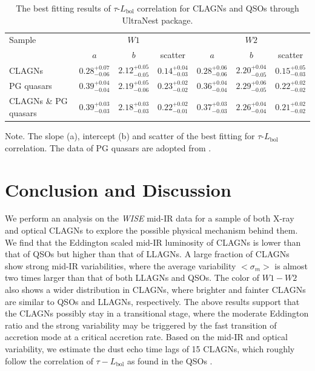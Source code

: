 \documentclass[linenumbers]{aastex631}
\begin{document}
\begin{table}[h!]
\renewcommand{\arraystretch}{1.5}
 \caption{The best fitting results of $\tau$-$L_{\mathrm{bol}}$ correlation for CLAGNs and QSOs through UltraNest package.
}
 \label{table_tau_L_fit}
 \begin{center}
 \begin{tabular}{lcccccc}
 \hline\hline
Sample    & \multicolumn{3}{c}{$W1$} &   \multicolumn{3}{c}{$W2$}      \\ %
           &    $a$    & $b$   &    scatter   &  $a$            &     $b$    & scatter        \\ \hline
CLAGNs      &    $0.28^{+0.07}_{-0.06}$ & $2.12^{+0.05}_{-0.05}$ & $0.14^{+0.04}_{-0.03}$  & $0.28^{+0.06}_{-0.06}$  &  $2.20^{+0.04}_{-0.05}$     &  $0.15^{+0.05}_{-0.03}$  \\ 
PG quasars    &    $0.39^{+0.04}_{-0.04}$ & $2.19^{+0.05}_{-0.06}$  &   $0.23^{+0.02}_{-0.02}$   & $0.36^{+0.04}_{-0.04}$  & $2.29^{+0.06}_{-0.05}$    & $0.22^{+0.02}_{-0.02}$  \\
CLAGNs \& PG quasars &   $0.39^{+0.03}_{-0.03}$ & $2.18^{+0.03}_{-0.03}$ & $0.22^{+0.02}_{-0.01}$ & $0.37^{+0.03}_{-0.03}$   & $2.26^{+0.04}_{-0.04}$        &$0.21^{+0.02}_{-0.02}$   \\ 

\hline\hline
\end{tabular}
\end{center}
Note. The slope (a), intercept (b) and scatter of the best fitting for $\tau$-$L_{\mathrm{bol}}$ correlation. The data of PG quasars are adopted from \citet{2019ApJ...886...33L}.
\end{table}


\section{Conclusion and Discussion} \label{sec:dis}
We perform an analysis on the {\it WISE} mid-IR data for a sample of both X-ray and optical CLAGNs to explore the possible physical mechanism behind them. We find that the Eddington scaled mid-IR luminosity of CLAGNs is lower than that of QSOs but higher than that of LLAGNs. A large fraction of CLAGNs show strong mid-IR variabilities, where the average variability $<\sigma_{m}>$ is almost two times larger than that of both LLAGNs and QSOs. The color of $W1-W2$ also shows a wider distribution in CLAGNs, where brighter and fainter CLAGNs are similar to QSOs and LLAGNs, respectively. The above results support that the CLAGNs possibly stay in a transitional stage, where the moderate Eddington ratio and the strong variability may be triggered by the fast transition of accretion mode at a critical accretion rate. Based on the mid-IR and optical variability, we estimate the dust echo time lags of 15 CLAGNs, which roughly follow the correlation of $\tau-L_\mathrm{bol}$ as found in the QSOs \citep{2019ApJ...886...33L}. 
\end{document}
